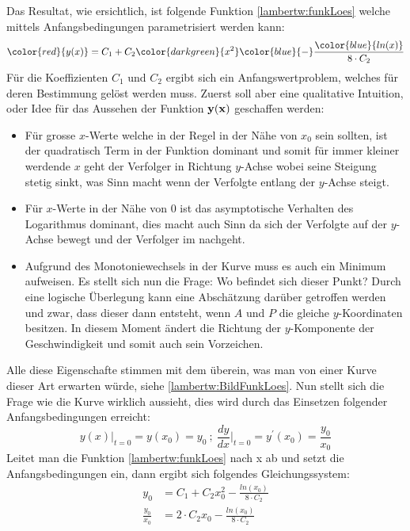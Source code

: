 Das Resultat, wie ersichtlich, ist folgende Funktion \eqref{lambertw:funkLoes} welche mittels Anfangsbedingungen parametrisiert werden kann: 
\begin{equation}
	{\color{red}{y(x)}}
	=
	C_1 + C_2 {\color{darkgreen}{x^2}} {\color{blue}{-}} \frac{\color{blue}{ln(x)}}{8 \cdot C_2}
	\label{lambertw:funkLoes}
\end{equation}
Für die Koeffizienten \(C_1\) und \(C_2\) ergibt sich ein Anfangswertproblem, welches für deren Bestimmung gelöst werden muss. Zuerst soll aber eine qualitative Intuition, oder Idee für das Aussehen der Funktion \(\bf{y(x)}\) geschaffen werden:
\begin{itemize}
	\item
	Für grosse \(x\)-Werte welche in der Regel in der Nähe von \(x_0\) sein sollten, ist der quadratisch Term in der Funktion dominant und somit für immer kleiner werdende \(x\) geht der Verfolger in Richtung \(y\)-Achse wobei seine Steigung stetig sinkt, was Sinn macht wenn der Verfolgte entlang der \(y\)-Achse steigt.
	\item
	Für \(x\)-Werte in der Nähe von \(0\) ist das asymptotische Verhalten des Logarithmus dominant, dies macht auch Sinn da sich der Verfolgte auf der \(y\)-Achse bewegt und der Verfolger im nachgeht.
	\item
	Aufgrund des Monotoniewechsels in der Kurve muss es auch ein Minimum aufweisen. Es stellt sich nun die Frage: Wo befindet sich dieser Punkt? Durch eine logische Überlegung kann eine Abschätzung darüber getroffen werden und zwar, dass dieser dann entsteht, wenn \(A\) und \(P\) die gleiche \(y\)-Koordinaten besitzen. In diesem Moment ändert die Richtung der \(y\)-Komponente der Geschwindigkeit und somit auch sein Vorzeichen.
\end{itemize}
Alle diese Eigenschafte stimmen mit dem überein, was man von einer Kurve dieser Art erwarten würde, siehe \ref{lambertw:BildFunkLoes}. Nun stellt sich die Frage wie die Kurve wirklich aussieht, dies wird durch das Einsetzen folgender Anfangsbedingungen erreicht:
\begin{equation}
	y(x)\big \vert_{t=0}
	=
	y(x_0)
	= 
	y_0
	\:;\:
	\frac{dy}{dx}\bigg \vert_{t=0}
	=
	y^{\prime}(x_0)
	=
	\frac{y_0}{x_0}
\end{equation}
Leitet man die Funktion \eqref{lambertw:funkLoes} nach x ab und setzt die Anfangsbedingungen ein, dann ergibt sich folgendes Gleichungssystem:
\begin{subequations}
	\begin{align}
		y_0
		&=
		C_1 + C_2 x^2_0 - \frac{ln(x_0)}{8 \cdot C_2} \\
		\frac{y_0}{x_0}
		&=
		 2 \cdot  C_2 x_0 - \frac{ln(x_0)}{8 \cdot C_2}
	\end{align}
\end{subequations}
